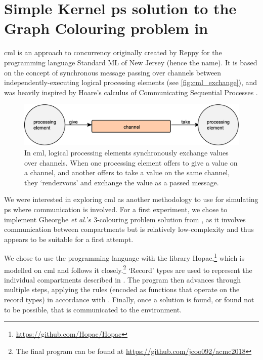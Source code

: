 \section{\label{sec:cml}Simple Kernel \texorpdfstring{\gls{ps}}{P systems} solution to the Graph Colouring problem in \texorpdfstring{}{Concurrent ML}}
\Gls{cml} is an approach to concurrency originally created by Reppy \cite{Reppy1991} for the programming language Standard ML of New Jersey (hence the name).  It is based on the concept of synchronous message passing over channels between independently-executing logical processing elements \cite{Panangaden1997} (see \autoref{fig:cml_exchange}), and was heavily inspired by Hoare's calculus of Communicating Sequential Processes \cite{Hoare1985}.  

\begin{figure}
    \centering
    \includegraphics[width=\textwidth]{chapters/gcol/figs/cml_exchange.eps}
    \caption{In \gls{cml}, logical processing elements synchronously exchange values over channels.  When one processing element offers to give a value on a channel, and another offers to take a value on the same channel, they ‘rendezvous’ and exchange the value as a passed message.}
    \label{fig:cml_exchange}
\end{figure}

We were interested in exploring \gls{cml} as another methodology to use for simulating \gls{ps} where communication is involved.  For a first experiment, we chose to implement Gheorghe \textit{et al.}'s 3-colouring problem solution from \cite{Gheorghe2013}, as it involves communication between compartments but is relatively low-complexity and thus appears to be suitable for a first attempt.

We chose to use the programming language \fsharp{} with the library Hopac,\footnote{\url{https://github.com/Hopac/Hopac}} which is modelled on \gls{cml} and follows it closely.\footnote{The final program can be found at \url{https://github.com/jcoo092/acmc2018}}  `Record' types are used to represent the individual compartments described in \cite{Gheorghe2013}.  The program then advances through multiple steps, applying the rules (encoded as functions that operate on the record types) in accordance with \cite{Gheorghe2013}.  Finally, once a solution is found, or found not to be possible, that is communicated to the environment.

